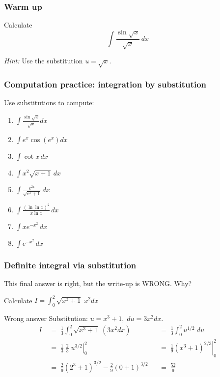 \documentclass[14pt]{beamer}
\date{}
\title{}
\author{}
\newcommand {\DS} [1] {${\displaystyle #1}$}
\newcommand{\p}{\pause}
\newcommand{\setsize}[1]{\fontsize{#1}{#1}\selectfont} %
\newcommand{\smallerfont}{\setsize{13}} %
\newcommand{\vv}{\vspace{.2cm}}
\begin{document}

\begin{frame}[t]
\frametitle{Warm up}

Calculate
	$$
		\int \frac{\sin \sqrt{x}}{\sqrt{x}} \, dx
	$$

\emph{Hint:}  Use the substitution \DS{u=\sqrt{x}}.

\end{frame}

\begin{frame}[t]
\frametitle{Computation practice: integration by substitution}

Use substitutions to compute:
\begin{multicols}{2}
	\begin{enumerate}
		\item \DS{\int \frac{\sin \sqrt{x}}{\sqrt{x}} dx}
		\vv
		\item  \DS{ \int e^x \cos \left(e^x \right) dx }
		\vv
		\item  \DS{ \int \cot x \, dx }
		\vv
		\item  \DS{ \int x^2 \sqrt{x+1} \, dx }
		\vv
\p
		\item \DS{\int \frac{e^{2x}}{\sqrt{e^x + 1}} \, dx}
		\vv
		\item \DS{\int \frac{\left( \ln \ln x \right)^2}{ x \ln x} \, dx}
		\vv
		\item \DS{\int x e^{-x^2} \, dx}
		\vv
		\item \DS{\int e^{-x^2} \, dx}
		\vv
	\end{enumerate}
\end{multicols}

\end{frame}
\begin{frame}
\smallerfont
\frametitle{Definite integral via substitution}

This final answer is right, but the write-up is WRONG.  Why?
\vfill

Calculate \DS{I = \int_0^2 \sqrt{x^3+1} \; x^2 dx}
\begin{block}{Wrong answer}
Substitution:  \DS{u = x^3+1, \; du=3x^2 dx}.
\begin{align*}
	I \; & = \; 
		 \frac{1}{3} \int_0^2   \sqrt{x^3+1} \; (3x^2 dx) 
	 &&=  \;	
		  \frac{1}{3} \int_0^2   u^{1/2}  \; du
	\\ &=  \;
		\frac{1}{3} \; \frac{2}{3}  \; \left. u^{3/2}  \right\vert_0^2
	&& = \; 
		 \left. \frac{1}{9} \left(x^3+1\right)^{2/3}     \right\vert_0^2	
	\\ &=  \;
		 \frac{2}{9} \left( 2^3 + 1 \right)^{3/2} - \frac{2}{9} \left( 0 + 1\right)^{3/2}  
	&&= \; \frac{52}{9}
\end{align*}
\end{block}

\end{frame}
\end{document}
